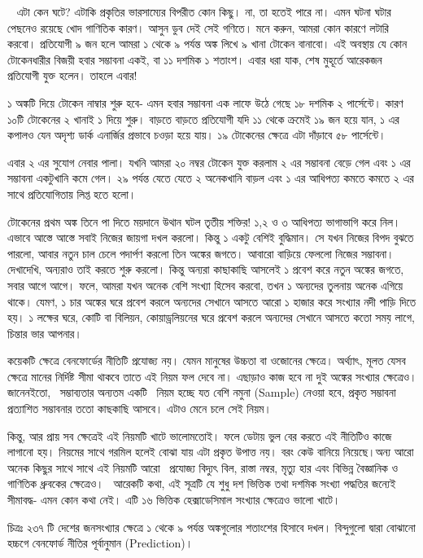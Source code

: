 \documentclass[
]{book}
\begin{document}
~
এটা কেন ঘটে? এটাকি প্রকৃতির ভারসাম্যের বিপরীত কোন কিছু। না, তা হতেই পারে না। এমন ঘটনা ঘটার পেছনেও রয়েছে খোদ গাণিতিক কারণ। আসুন ডুব দেই সেই গণিতে। মনে করুন, আমরা কোন কারণে লটারি করবো। প্রতিযোগী ৯ জন হলে আমরা ১ থেকে ৯ পর্যন্ত অঙ্ক লিখে ৯ খানা টোকেন বানাবো। এই অবস্থায় যে কোন টোকেনধারীর বিজয়ী হবার সম্ভাবনা একই, বা ১১ দশমিক ১ শতাংশ। এবার ধরা যাক, শেষ মুহূর্তে আরেকজন প্রতিযোগী যুক্ত হলেন। তাহলে এবার!

১ অঙ্কটি দিয়ে টোকেন নাম্বার শুরু হবে- এমন হবার সম্ভাবনা এক লাফে উঠে গেছে ১৮ দশমিক ২ পার্সেন্টে। কারণ ১০টি টোকেনের ২ খানাই ১ দিয়ে শুরু। বাড়তে বাড়তে প্রতিযোগী যদি ১১ থেকে ক্রমেই ১৯ জন হয়ে যান, ১ এর কপালও যেন অদৃশ্য ডার্ক এনার্জির প্রভাবে চওড়া হয়ে যায়। ১৯ টোকেনের ক্ষেত্রে এটা দাঁড়াবে ৫৮ পার্সেন্টে।~

এবার ২ এর সুযোগ নেবার পালা। যখনি আমরা ২০ নম্বর টোকেন যুক্ত করলাম ২ এর সম্ভাবনা বেড়ে গেল এবং ১ এর সম্ভাবনা একটুখানি কমে গেল। ২৯ পর্যন্ত যেতে যেতে ২ অনেকখানি বাড়ল এবং ১ এর আধিপত্য কমতে কমতে ২ এর সাথে প্রতিযোগিতায় লিপ্ত হতে হলো।~

টোকেনের প্রথম অঙ্ক তিনে পা দিতে ময়দানে উথান ঘটল তৃতীয় শক্তির! ১,২ ও ৩ আধিপত্য ভাগাভাগি করে নিল। এভাবে আস্তে আস্তে সবাই নিজের জায়গা দখল করলো। কিন্তু ১ একটু বেশিই বুদ্ধিমান। সে যখন নিজের বিপদ বুঝতে পারলো, আবার নতুন চাল চেলে পদার্পণ করলো তিন অঙ্কের জগতে। আবারো বাড়িয়ে ফেললো নিজের সম্ভাবনা। দেখাদেখি, অন্যরাও তাই করতে শুরু করলো। কিন্তু অন্যরা কাছাকাছি আসলেই ১ প্রবেশ করে নতুন অঙ্কের জগতে, সবার আগে আগে। ফলে, আমরা যখন অনেক বেশি সংখ্যা হিসেব করবো, তখন ১ অন্যদের তুলনায় অনেক এগিয়ে থাকে। যেমণ, ১ চার অঙ্কের ঘরে প্রবেশ করলে অন্যদের সেখানে আসতে আরো ১ হাজার করে সংখ্যার নদী পাড়ি দিতে হয়। ১ লক্ষের ঘরে, কোটি বা বিলিয়ন, কোয়াড্রলিয়নের ঘরে প্রবেশ করলে অন্যদের সেখানে আসতে কতো সময় লাগে, চিন্তার ভার আপনার।~

কয়েকটি ক্ষেত্রে বেনফোর্ডের নীতিটি প্রযোজ্য নয়। যেমন মানুষের উচ্চতা বা ওজোনের ক্ষেত্রে। অর্থ্যাৎ, মূলত যেসব ক্ষেত্রে মানের নির্দিষ্ট সীমা থাকবে তাতে এই নিয়ম ফল দেবে না। এছাড়াও কাজ হবে না দুই অঙ্কের সংখ্যার ক্ষেত্রেও। জানেনইতো,~ সম্ভাব্যতার অন্যতম একটি~ নিয়ম হচ্ছে যত বেশি নমুনা (Sample) নেওয়া হবে, প্রকৃত সম্ভাবনা প্রত্যাশিত সম্ভাবনার ততো কাছকাছি আসবে। এটাও মেনে চলে সেই নিয়ম।~

কিন্তু, আর প্রায় সব ক্ষেত্রেই এই নিয়মটি খাটে ভালোমতোই। ফলে ডেটায় ভুল বের করতে এই নীতিটিও কাজে লাগানো হয়। নিয়মের সাথে গরমিল হলেই বোঝা যায় এটা প্রকৃত উপাত্ত নয়। বরং কেউ বানিয়ে নিয়েছে।অন্য আরো অনেক কিছুর সাথে সাথে এই নিয়মটি আরো~ প্রযোজ্য বিদ্যুৎ বিল, রাস্তা নম্বর, মৃত্যু হার এবং বিভিন্ন বৈজ্ঞানিক ও গাণিতিক ধ্রুবকের ক্ষেত্রেও।~
আরেকটি কথা, এই সূত্রটি যে শুধু দশ ভিত্তিক তথা দশমিক সংখ্যা পদ্ধতির জন্যেই সীমাবদ্ধ- এমন কোন কথা নেই। এটি ১৬ ভিত্তিক হেক্সাডেসিমাল সংখ্যার ক্ষেত্রেও ভালো খাটে।

চিত্রঃ ২৩৭ টি দেশের জনসংখ্যার ক্ষেত্রে ১ থেকে ৯ পর্যন্ত অঙ্কগুলোর শতাংশের হিসাবে দখল। বিন্দুগুলো দ্বারা বোঝানো হচ্চগে বেনফোর্ড নীতির পূর্বানুমান (Prediction)।

  
\end{document}
